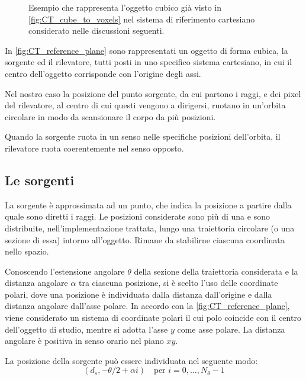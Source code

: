 \documentclass[12pt,a4paper]{report}
\begin{document}
\begin{figure}[H]
{
  }
  \caption{\label{fig:CT_reference_plane} Esempio che rappresenta l'oggetto cubico già visto in \autoref{fig:CT_cube_to_voxels}
           nel sistema di riferimento cartesiano considerato nelle discussioni seguenti.}
\end{figure}

In \autoref{fig:CT_reference_plane} sono rappresentati un oggetto di forma cubica, la sorgente ed il rilevatore, tutti posti
in uno specifico sistema cartesiano, in cui il centro dell'oggetto corrisponde con l'origine degli assi.

Nel nostro caso la posizione del punto sorgente, da cui partono i raggi, e dei pixel del rilevatore, al centro di cui questi
vengono a dirigersi, ruotano in un'orbita circolare in modo da scansionare il corpo da più posizioni.

Quando la sorgente ruota in un senso nelle specifiche posizioni dell'orbita, il rilevatore ruota coerentemente nel senso opposto.

\subsection{Le sorgenti}

La sorgente è approssimata ad un punto, che indica la posizione a partire dalla quale sono diretti i raggi.
Le posizioni considerate sono più di una e sono distribuite, nell'implementazione trattata, lungo una traiettoria circolare
(o una sezione di essa) intorno all'oggetto.
Rimane da stabilirne ciascuna coordinata nello spazio.

Conoscendo l'estensione angolare \(\theta\) della sezione della traiettoria considerata e la distanza angolare \(\alpha\) tra
ciascuna posizione, si è scelto l'uso delle coordinate polari, dove una posizione è individuata dalla distanza dall'origine e
dalla distanza angolare dall'asse polare.
In accordo con la \autoref{fig:CT_reference_plane}, viene considerato un sistema di coordinate polari il cui polo coincide con
il centro dell'oggetto di studio, mentre si adotta l'asse \(y\) come asse polare.
La distanza angolare è positiva in senso orario nel piano \(xy\).

La posizione della sorgente può essere individuata nel seguente modo:
\begin{equation} \label{eq:goniometric_source_polar}
  (d_s,-\theta/2 + \alpha i) \quad \text{per } i = 0, \dots, N_\theta - 1
\end{equation}
\end{document}
